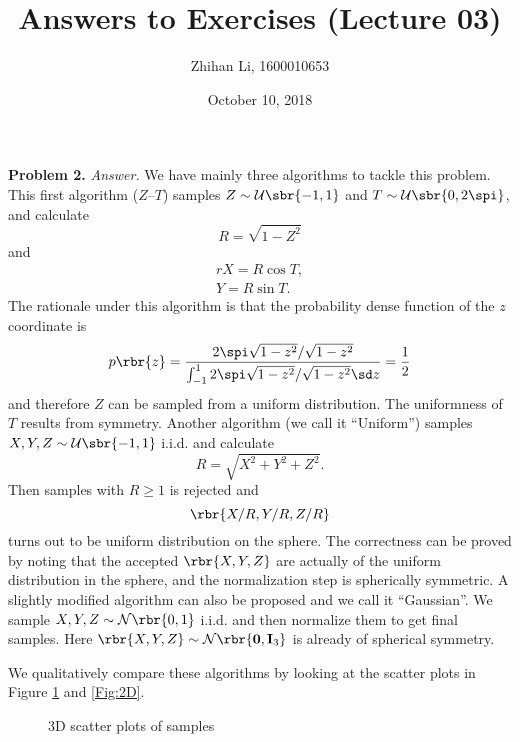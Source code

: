 \documentclass[english, nochinese]{pnote}
\title{Answers to Exercises (Lecture 03)}
\author{Zhihan Li, 1600010653}
\date{October 10, 2018}
\begin{document}
\maketitle

\textbf{Problem 2.} \textit{Answer.} We have mainly three algorithms to tackle this problem. This first algorithm ($Z$--$T$) samples $ Z \sim \mathcal{U} \sbr{ -1, 1 } $ and $ T \sim \mathcal{U} \sbr{ 0, 2 \spi } $, and calculate
\begin{equation}
R = \sqrt{ 1 - Z^2 }
\end{equation}
and
\begin{gather}r
X = R \cos T, \\
Y = R \sin T.
\end{gather}
The rationale under this algorithm is that the probability dense function of the $z$ coordinate is
\begin{equation}
p \rbr{z} = \frac{ 2 \spi \sqrt{ 1 - z^2 } / \sqrt{ 1 - z^2 } }{ \int_{-1}^1 2 \spi \sqrt{ 1 - z^2 } / \sqrt{ 1 - z^2 } \sd z } = \frac{1}{2}
\end{equation}
and therefore $Z$ can be sampled from a uniform distribution. The uniformness of $T$ results from symmetry.
Another algorithm (we call it ``Uniform'') samples $ X, Y, Z \sim \mathcal{U} \sbr{ -1, 1 } $ i.i.d. and calculate
\begin{equation}
R = \sqrt{ X^2 + Y^2 + Z^2 }.
\end{equation}
Then samples with $ R \ge 1 $ is rejected and
\begin{equation}
\rbr{ X / R, Y / R, Z / R }
\end{equation}
turns out to be uniform distribution on the sphere. The correctness can be proved by noting that the accepted $ \rbr{ X, Y, Z } $ are actually of the uniform distribution in the sphere, and the normalization step is spherically symmetric. A slightly modified algorithm can also be proposed and we call it ``Gaussian''. We sample $ X, Y, Z \sim \mathcal{N} \rbr{ 0, 1 } $ i.i.d. and then normalize them to get final samples. Here $ \rbr{ X, Y, Z } \sim \mathcal{N} \rbr{ \mathbf{0}, \mathbf{I}_3 } $ is already of spherical symmetry.

We qualitatively compare these algorithms by looking at the scatter plots in Figure \ref{Fig:3D} and \ref{Fig:2D}.

\begin{figure}[htb]
\centering
\scalebox{0.7}{}
\caption{3D scatter plots of samples}
\label{Fig:3D}
\end{figure}
\end{document}
